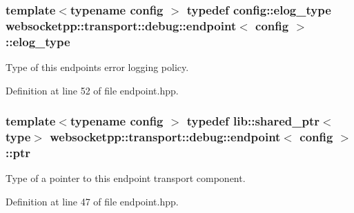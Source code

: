 \hypertarget{classwebsocketpp_1_1transport_1_1debug_1_1endpoint_a3616bf82ba2a1026fad9de8145bd9375}{}
\subsubsection[{elog\+\_\+type}]{\setlength{\rightskip}{0pt plus 5cm}template$<$typename config $>$ typedef config\+::elog\+\_\+type {\bf websocketpp\+::transport\+::debug\+::endpoint}$<$ config $>$\+::{\bf elog\+\_\+type}}\label{classwebsocketpp_1_1transport_1_1debug_1_1endpoint_a3616bf82ba2a1026fad9de8145bd9375}


Type of this endpoint\textquotesingle{}s error logging policy. 



Definition at line 52 of file endpoint.\+hpp.

\hypertarget{classwebsocketpp_1_1transport_1_1debug_1_1endpoint_a947f3252f16c34680638f0ed9ef95aa3}{}
\subsubsection[{ptr}]{\setlength{\rightskip}{0pt plus 5cm}template$<$typename config $>$ typedef lib\+::shared\+\_\+ptr$<${\bf type}$>$ {\bf websocketpp\+::transport\+::debug\+::endpoint}$<$ config $>$\+::{\bf ptr}}\label{classwebsocketpp_1_1transport_1_1debug_1_1endpoint_a947f3252f16c34680638f0ed9ef95aa3}


Type of a pointer to this endpoint transport component. 



Definition at line 47 of file endpoint.\+hpp.

\hypertarget{classwebsocketpp_1_1transport_1_1debug_1_1endpoint_ab261a090fca072aea9b5dba04aba4c6d}{}
